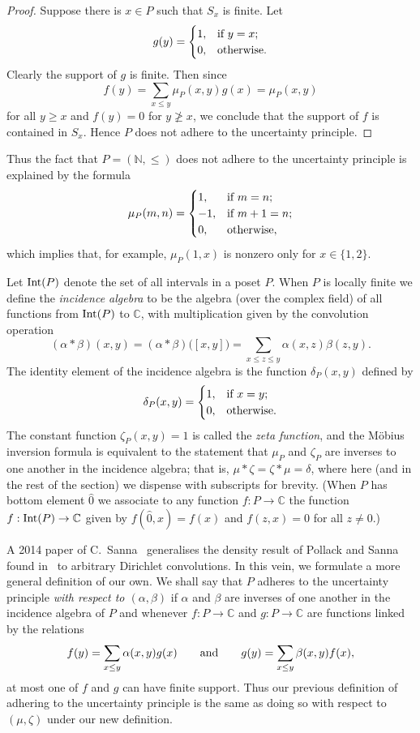 \documentclass[11pt]{amsart}
\theoremstyle{myexample}
\theoremstyle{myremark}
\theoremstyle{conjecture}
\numberwithin{equation}{section}
\def\bottom{\widehat 0}
\def\Int{\hbox{\rm Int}}
\def\CC{\mathbb{C}}
\def\NN{\mathbb{N}}
\begin{document}
\begin{proof}
Suppose there is $x\in P$ such that $S_x$ is finite. Let
$$g(y) = \begin{cases}
1, & \textrm{if $y=x$}; \cr 0, & \textrm{otherwise}.
\end{cases}$$
Clearly the support of $g$ is finite. Then since
$$f(y) = \sum_{x \le y} \mu_P(x,y) g(x) = \mu_P(x,y)$$
for all $y\ge x$ and $f(y) = 0$ for $y\not\ge x$, we conclude that the support of $f$ is contained in $S_x$.
Hence $P$ does not adhere to the uncertainty principle.
\end{proof}

Thus the fact that $P = (\NN,\le)$
does not adhere to the uncertainty principle is explained by the formula
$$\mu_P (m,n) = \begin{cases}
1, & \textrm{if $m=n$};\cr -1, & \textrm{if $m+1=n$};\cr 0, & \textrm{otherwise},
\end{cases}$$
which implies that, for example, $\mu_P(1,x)$ is nonzero only for $x\in \{1,2\}$.

\medskip{}\enspace
Let $\Int(P)$ denote the set of all intervals in a poset $P$. When $P$ is locally finite we define the
{\it incidence algebra} to be the algebra (over the complex field) of all functions from $\Int(P)$
to $\CC$, with multiplication given by the convolution operation
$$ (\alpha * \beta)(x,y) = (\alpha *\beta)\bigl([x,y]\bigr) = \sum_{x\le z\le y} \alpha(x,z)\beta(z,y).$$
The identity element of the incidence algebra is the function $\delta_P(x,y)$ defined by
$$\delta_P(x,y) = \begin{cases}
1, & \textrm{if $x = y$};\cr 0, & \textrm{otherwise.}
\end{cases}$$
The constant function $\zeta_P(x,y) = 1$ is called the {\it zeta function}, and the M\"obius inversion
formula is equivalent to the statement that $\mu_P$ and $\zeta_P$ are inverses to one another
in the incidence algebra; that is, $\mu * \zeta = \zeta * \mu = \delta$, where here (and in the rest
of the section) we dispense with
subscripts for brevity. (When $P$ has bottom element $\bottom$ we associate to any function $f:P\to\CC$
the function $f:\Int(P)\to \CC$ given by $f(\bottom, x) = f(x)$ and $f(z,x) = 0$ for all $z\ne 0$.)

A 2014 paper of C.~Sanna~\cite{sanna2014} generalises the density result of Pollack and Sanna found
in~\cite{pollacksanna} to arbitrary Dirichlet convolutions. In this vein, we formulate a more
general definition of our own. We shall say that $P$ adheres to the uncertainty
principle {\it with respect to $(\alpha,\beta)$} if $\alpha$ and $\beta$ are inverses of one another
in the incidence algebra of $P$ and whenever $f:P\to \CC$ and $g:P\to\CC$ are functions linked by
the relations
$$f(y) = \sum_{x\le y} \alpha(x,y)g(x)\qquad\hbox{and}\qquad
g(y) = \sum_{x\le y} \beta(x,y)f(x),$$
at most one of $f$ and $g$ can have finite support. Thus our previous definition of adhering
to the uncertainty principle is the same as doing so with respect to $(\mu,\zeta)$ under our new definition.
\end{document}
